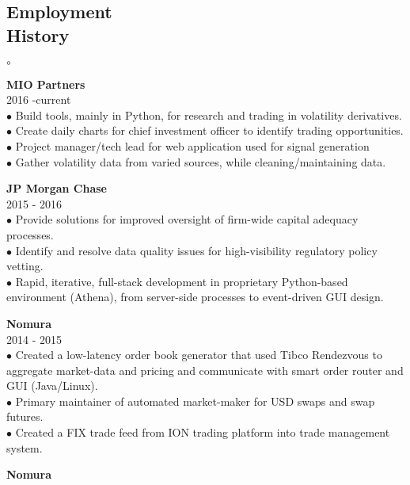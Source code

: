 \documentclass[margin]{res}
\newenvironment{list1}{
  \begin{list}{$\circ$}{
      \setlength{\itemsep}{0.0in}
      \setlength{\parsep}{0in} \setlength{\parskip}{0in}
      \setlength{\topsep}{0in} \setlength{\partopsep}{0in} 
      \setlength{\leftmargin}{0.1in}
      }}
      {\end{list}}
\begin{document}
\begin{resume}
\section{\helv Employment\\ History}
\begin{list1}
\item {\bf MIO Partners}\\
2016 -current\\[0.05cm]
$\bullet$ Build tools, mainly in Python, for research and trading in volatility derivatives. \\[0.05cm]
$\bullet$ Create daily charts for chief investment officer to identify trading opportunities. \\[0.05cm]
$\bullet$ Project manager/tech lead for web application used for signal generation\\[0.05cm]
$\bullet$ Gather volatility data from varied sources, while cleaning/maintaining data.
\vspace{0.1cm}
\item {\bf JP Morgan Chase}\\[0.05cm]
2015 - 2016\\[0.05cm]
$\bullet$ Provide solutions for improved oversight of firm-wide capital adequacy processes. \\[0.05cm]
$\bullet$ Identify and resolve data quality issues for high-visibility regulatory policy vetting.\\[0.05cm]
$\bullet$ Rapid, iterative, full-stack development in proprietary Python-based environment (Athena), from server-side processes to event-driven GUI design.
\vspace{0.1cm}
\item {\bf Nomura }\\ 
2014 - 2015 \\[0.05cm]
$\bullet$ Created a low-latency order book generator that used Tibco Rendezvous to aggregate market-data and pricing and communicate with smart order router and GUI (Java/Linux). \\[0.05cm]
$\bullet$ Primary maintainer of  automated market-maker for USD swaps and swap futures.\\[0.05cm]
$\bullet$ Created a FIX trade feed from ION trading platform into trade management system.
\vspace{0.1cm}
\item {\bf Nomura}\\

\end{list1}
\end{resume}
\end{document}
